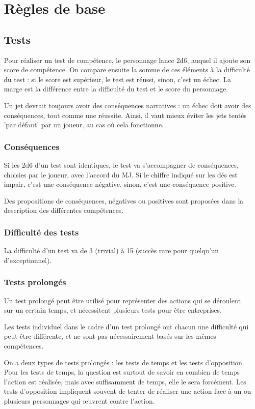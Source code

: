 \documentclass[10pt,a4paper]{book}
\begin{document}
\chapter{Règles de base}
\begin{multicols}{2}
\section{Tests}
Pour réaliser un test de compétence, le personnage lance 2d6, auquel il ajoute son score de compétence. On compare ensuite la somme de ces éléments à la difficulté du test : si le score est supérieur, le test est réussi, sinon, c'est un échec. La marge est la différence entre la difficulté du test et le score du personnage.

Un jet devrait toujours avoir des conséquences narratives : un échec doit avoir des conséquences, tout comme une réussite. Ainsi, il vaut mieux éviter les jets tentés 'par défaut' par un joueur, au cas où cela fonctionne.

\subsection{Conséquences}
Si les 2d6 d'un test sont identiques, le test va s'accompagner de conséquences, choisies par le joueur, avec l'accord du MJ. Si le chiffre indiqué sur les dés est impair, c'est une conséquence négative, sinon, c'est une conséquence positive.

Des propositions de conséquences, négatives ou positives sont proposées dans la description des différentes compétences.
\subsection{Difficulté des tests}
La difficulté d'un test va de 3 (trivial) à 15 (succès rare pour quelqu'un d'exceptionnel).
\subsection{Tests prolongés}
Un test prolongé peut être utilisé pour représenter des actions qui se déroulent sur un certain temps, et nécessitent plusieurs tests  pour être entreprises.

Les tests individuel dans le cadre d'un test prolongé ont chacun une difficulté qui peut être différente, et ne sont pas nécessairement basés sur les mêmes compétences. 

On a deux types de tests prolongés : les tests de temps et les tests d'opposition. Pour les tests de temps, la question est surtout de savoir en combien de temps l'action est réalisée, mais avec suffisamment de temps, elle le sera forcément. Les tests d'opposition impliquent souvent de tenter de réaliser une action face à un ou plusieurs personnages qui œuvrent contre l'action.


\end{multicols}
\end{document}
